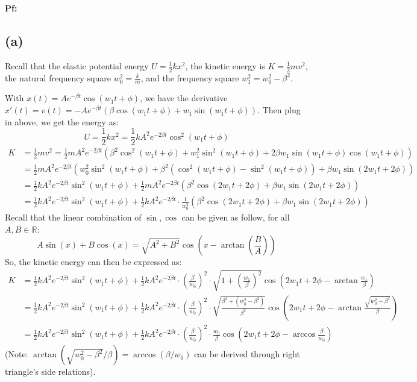 \documentclass{article}
\newcommand{\RR}{\mathbb{R}}
\begin{document}
\textbf{Pf:}

\subsection*{(a)}
Recall that the elastic potential energy $U=\frac{1}{2}kx^2$, the kinetic energy is $K=\frac{1}{2}mv^2$, the natural frequency square $w_0^2=\frac{k}{m}$, and the frequency square $w_1^2=w_0^2-\beta^2$.

With $x(t)=Ae^{-\beta t}\cos(w_1t+\phi)$, we have the derivative $x'(t)=v(t)=-Ae^{-\beta t}(\beta \cos(w_1t+\phi)+w_1\sin(w_1t+\phi))$. Then plug in above, we get the energy as:
\begin{equation}
    U=\frac{1}{2}kx^2 = \frac{1}{2}kA^2e^{-2\beta t}\cos^2(w_1t+\phi)
\end{equation}
\begin{align}
    K&=\frac{1}{2}mv^2 = \frac{1}{2}mA^2e^{-2\beta t}(\beta^2\cos^2(w_1t+\phi)+w_1^2\sin^2(w_1t+\phi)+2\beta w_1\sin(w_1t+\phi)\cos(w_1t+\phi))\\
    &= \frac{1}{2}mA^2e^{-2\beta t}(w_0^2\sin^2(w_1t+\phi)+\beta^2(\cos^2(w_1t+\phi)-\sin^2(w_1t+\phi))+\beta w_1\sin(2w_1t+2\phi))\\
    &= \frac{1}{2}kA^2e^{-2\beta t}\sin^2(w_1t+\phi) + \frac{1}{2}mA^2e^{-2\beta t}(\beta^2\cos(2w_1t+2\phi)+\beta w_1\sin(2w_1t+2\phi))\\
    &=\frac{1}{2}kA^2e^{-2\beta t}\sin^2(w_1t+\phi) + \frac{1}{2}kA^2e^{-2\beta t}\cdot\frac{1}{w_0^2}\left(\beta^2\cos(2w_1t+2\phi)+\beta w_1\sin(2w_1t+2\phi)\right)
\end{align}
Recall that the linear combination of $\sin,\cos$ can be given as follow, for all $A,B\in \RR$:
\begin{equation}
    A\sin(x)+B\cos(x) = \sqrt{A^2+B^2}\cos\left(x-\arctan\left(\frac{B}{A}\right)\right)
\end{equation}
So, the kinetic energy can then be expressed as:
\begin{align}
    K&=\frac{1}{2}kA^2e^{-2\beta t}\sin^2(w_1t+\phi)+\frac{1}{2}kA^2e^{-2\beta t}\cdot\left(\frac{\beta}{w_0}\right)^2\cdot \sqrt{1+\left(\frac{w_1}{\beta}\right)^2}\cos\left(2w_1t+2\phi - \arctan\frac{w_1}{\beta}\right)\\
    &=\frac{1}{2}kA^2e^{-2\beta t}\sin^2(w_1t+\phi)+\frac{1}{2}kA^2e^{-2\beta t}\cdot\left(\frac{\beta}{w_0}\right)^2\cdot \sqrt{\frac{\beta^2+(w_0^2-\beta^2)}{\beta^2}}\cos\left(2w_1t+2\phi - \arctan\frac{\sqrt{w_0^2-\beta^2}}{\beta}\right)\\
    &= \frac{1}{2}kA^2e^{-2\beta t}\sin^2(w_1t+\phi)+\frac{1}{2}kA^2e^{-2\beta t}\cdot\left(\frac{\beta}{w_0}\right)^2\cdot \frac{w_0}{\beta}\cos\left(2w_1t+2\phi - \arccos\frac{\beta}{w_0}\right)
\end{align}
(Note: $\arctan(\sqrt{w_0^2-\beta^2}/\beta)=\arccos(\beta/w_0)$ can be derived through right triangle's side relations).
\end{document}
